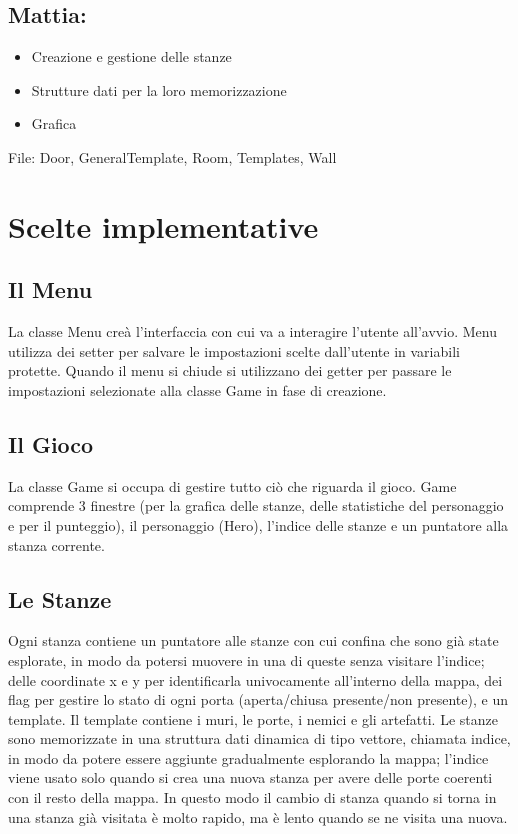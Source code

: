 \documentclass[12pt]{article}
\begin{document}
\subsection*{Mattia:}
\begin{itemize}
    \item Creazione e gestione delle stanze 
    \item Strutture dati per la loro memorizzazione
    \item Grafica
\end{itemize}
File: Door, GeneralTemplate, Room, Templates, Wall

\newpage
\section{Scelte implementative}
\subsection{Il Menu}
La classe Menu creà l'interfaccia con cui va a interagire l'utente all'avvio. Menu utilizza dei setter per salvare le impostazioni
scelte dall'utente in variabili protette. Quando il menu si chiude si utilizzano dei getter per passare le impostazioni selezionate
alla classe Game in fase di creazione.

\subsection{Il Gioco}
La classe Game si occupa di gestire tutto ciò che riguarda il gioco.
Game comprende 3 finestre (per la grafica delle stanze, delle statistiche del personaggio e per il punteggio), 
il personaggio (Hero), l'indice delle stanze e un puntatore alla stanza corrente.

\subsection{Le Stanze}
Ogni stanza contiene un puntatore alle stanze con cui confina che sono già state esplorate, in modo da potersi muovere in una 
di queste senza visitare l'indice; delle coordinate x e y per identificarla univocamente all'interno della mappa, dei flag per
 gestire lo stato di ogni porta (aperta/chiusa presente/non presente), e un template. Il template contiene i muri, le porte, 
 i nemici e gli artefatti. \hfill\break
Le stanze sono memorizzate in una struttura dati dinamica di tipo vettore, chiamata indice, in modo da potere essere aggiunte gradualmente 
esplorando la mappa; l'indice viene usato solo quando si crea una nuova stanza per avere delle porte coerenti con il resto della mappa.
In questo modo il cambio di stanza quando si torna in una stanza già visitata è molto rapido, ma è lento quando se ne visita una nuova. 
\end{document}
